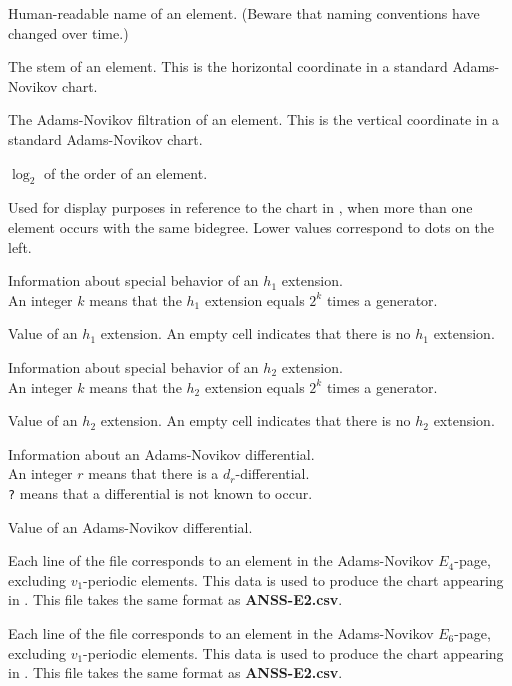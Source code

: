 \documentclass{amsart}
\begin{document}
  Human-readable name of an element.
(Beware that naming conventions have changed over time.)

 The stem of an element.  This is the
horizontal coordinate in a standard Adams-Novikov chart.

 The Adams-Novikov filtration of 
an element.  This is the vertical coordinate in a standard 
Adams-Novikov chart.

 $\log_2$ of the order of an element.

 Used for display purposes
in reference to the chart in \cite{IWX19d},
when more than one element occurs with the same bidegree.
Lower values correspond to dots on the left.

Information about special behavior of an $h_1$ extension. \\
An integer $k$ means that the $h_1$ extension equals
$2^k$ times a generator.

Value of an $h_1$ extension.  An empty cell indicates
that there is no $h_1$ extension.

Information about special behavior of an $h_2$ extension. \\
An integer $k$ means that the $h_2$ extension equals
$2^k$ times a generator.

Value of an $h_2$ extension.  An empty cell indicates
that there is no $h_2$ extension.

Information about an Adams-Novikov differential. \\
An integer $r$ means that there is a $d_r$-differential. \\
\texttt{?} means that a differential is not known to occur.

Value of an Adams-Novikov differential.

\newpage

Each line of the file corresponds to an element in the
Adams-Novikov $E_4$-page, excluding $v_1$-periodic elements.
This data is used to produce the
chart appearing in \cite{IWX19d}.
This file takes the same format as
\textbf{ANSS-E2.csv}.

Each line of the file corresponds to an element in the
Adams-Novikov $E_6$-page, excluding $v_1$-periodic elements.
This data is used to produce the
chart appearing in \cite{IWX19d}.
This file takes the same format as
\textbf{ANSS-E2.csv}.
\end{document}
